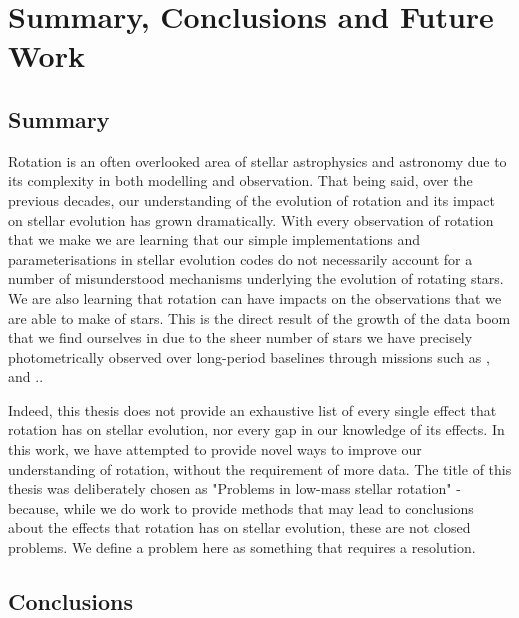  \chapter{Summary, Conclusions and Future Work}
\label{chap:conc}

\section{Summary}

Rotation is an often overlooked area of stellar astrophysics and astronomy due to its complexity in both modelling and observation.
That being said, over the previous decades, our understanding of the evolution of rotation and its impact on stellar evolution has grown dramatically.
With every observation of rotation that we make we are learning that our simple implementations and parameterisations in stellar evolution codes do not necessarily account for a number of misunderstood mechanisms underlying the evolution of rotating stars.
We are also learning that rotation can have impacts on the observations that we are able to make of stars.
This is the direct result of the growth of the data boom that we find ourselves in due to the sheer number of stars we have precisely photometrically observed over long-period baselines through missions such as \kepler \citep{borucki_kepler_2010}, \ktoo \citep{howell_k2_2014} and \tess \citep{ricker_transiting_2014}..

Indeed, this thesis does not provide an exhaustive list of every single effect that rotation has on stellar evolution, nor every gap in our knowledge of its effects.
In this work, we have attempted to provide novel ways to improve our understanding of rotation, without the requirement of more data.
The title of this thesis was deliberately chosen as "Problems in low-mass stellar rotation" - because, while we do work to provide methods that may lead to conclusions about the effects that rotation has on stellar evolution, these are not closed problems.
We define a problem here as something that requires a resolution.

\section{Conclusions}

